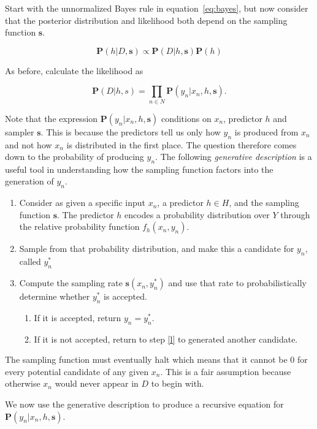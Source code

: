 \documentclass[twoside]{article}
\begin{document}
Start with the unnormalized Bayes rule in equation~\eqref{eq:bayes}, but now consider that the posterior distribution and likelihood both depend on the sampling function \(\mathbf{s}\).

\[\mathbf{P}(h|D,\mathbf{s})\propto\mathbf{P}(D|h,\mathbf{s})\mathbf{P}(h)\]

As before, calculate the likelihood as

\[\mathbf{P}(D|h,s)=\prod_{n \in N} \mathbf{P}(y_n|x_n,h,\mathbf{s}).\]

Note that the expression \(\mathbf{P}(y_n|x_n,h,\mathbf{s})\) conditions on \(x_n\), predictor \(h\) and sampler \(\mathbf{s}\). This is because the predictors tell us only how \(y_n\) is produced from \(x_n\) and not how \(x_n\) is distributed in the first place. The question therefore comes down to the probability of producing \(y_n\). The following \textit{generative description} is a useful tool in understanding how the sampling function factors into the generation of \(y_n\).

\begin{enumerate}
	\item Consider as given a specific input \(x_n\), a predictor \(h \in H\), and the sampling function \(\mathbf{s}\). The predictor \(h\) encodes a probability distribution over \(Y\) through the relative probability function \(f_h(x_n,y_n)\).
	\item \label{l} Sample from that probability distribution, and make this a candidate for \(y_n\), called \(y_n^*\)
	\item Compute the sampling rate \(\mathbf{s}(x_n,y_n^*)\) and use that rate to probabilistically determine whether \(y_n^*\) is accepted.
    \begin{enumerate}
        \item If it is accepted, return \(y_n=y_n^*\).
        \item If it is not accepted, return to step \ref{l} to generated another candidate.
    \end{enumerate}
\end{enumerate}

The sampling function must eventually halt which means that it cannot be 0 for every potential candidate of any given \(x_n\). This is a fair assumption because otherwise \(x_n\) would never appear in \(D\) to begin with.

We now use the generative description to produce a recursive equation for \(\mathbf{P}(y_n|x_n,h,\mathbf{s})\).
\end{document}

